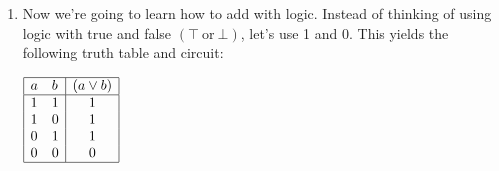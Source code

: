\documentclass[basic, header]{nosvagor-notes}
\begin{document}
\begin{enumerate}[itemsep=2em]
\begin{multicols}{2}
\begin{enumerate}
    \item \((\lnot a) \land (\lnot b)\) ; \textbf{satisfiable}
      \[%
        \begin{array}{|ll|c|}
          \hline
            \lnot a & \lnot b & (e) \\
          \hline
            0 & 0 & 0 \\
            0 & 1 & 0 \\
            1 & 0 & 0 \\
            1 & 1 & 1 \\
          \hline
        \end{array}
      \]%

    \item \(\lnot a \land (\lnot b \lor c)\) ; \textbf{satisfiable}
      \[%
        \begin{array}{|ccc|c|c|c|}
          \hline
          a & b & c & \lnot a & \lnot b \lor c & (f)\\
          \hline
          1 & 1 & 1 & 0 & 1 & 0\\
          1 & 1 & 0 & 0 & 0 & 0\\
          1 & 0 & 1 & 0 & 1 & 0\\
          1 & 0 & 0 & 0 & 1 & 0\\
          0 & 1 & 1 & 1 & 1 & 1\\
          0 & 1 & 0 & 1 & 0 & 0\\
          0 & 0 & 1 & 1 & 1 & 1\\
          0 & 0 & 0 & 1 & 1 & 1\\
          \hline
        \end{array}
      \]%

  \end{enumerate}
  \end{multicols}
\item Now we're going to learn how to add with logic. Instead of thinking of
  using logic with true and false \(\left(\top ~\text{or}~ \bot\right)\), let's
  use 1 and 0. This yields the following truth table and circuit:

  \begin{center}
      \(
      \begin{array}{|ll|c|}
        \hline
        a & b & (a \lor b)\\
        \hline
        1 & 1 & 1 \\
        1 & 0 & 1 \\
        0 & 1 & 1 \\
        0 & 0 & 0 \\
        \hline
      \end{array}
      \)


\end{center}
\end{enumerate}
\end{document}
